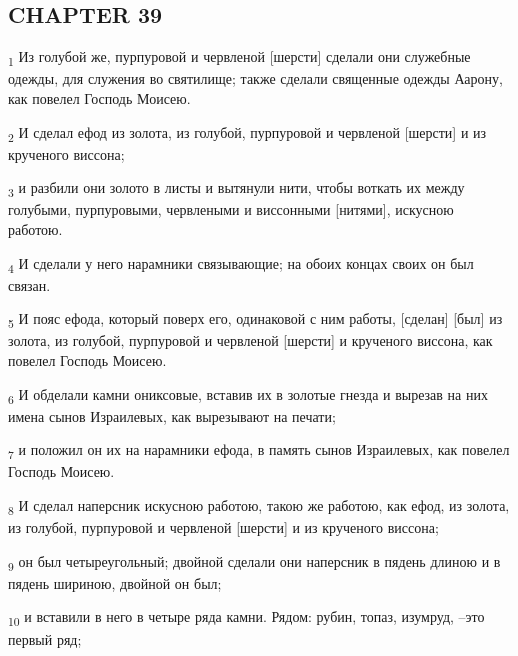\subsection{CHAPTER 39}
\begin{tcolorbox}
\textsubscript{1} Из голубой же, пурпуровой и червленой [шерсти] сделали они служебные одежды, для служения во святилище; также сделали священные одежды Аарону, как повелел Господь Моисею.
\end{tcolorbox}
\begin{tcolorbox}
\textsubscript{2} И сделал ефод из золота, из голубой, пурпуровой и червленой [шерсти] и из крученого виссона;
\end{tcolorbox}
\begin{tcolorbox}
\textsubscript{3} и разбили они золото в листы и вытянули нити, чтобы воткать их между голубыми, пурпуровыми, червлеными и виссонными [нитями], искусною работою.
\end{tcolorbox}
\begin{tcolorbox}
\textsubscript{4} И сделали у него нарамники связывающие; на обоих концах своих он был связан.
\end{tcolorbox}
\begin{tcolorbox}
\textsubscript{5} И пояс ефода, который поверх его, одинаковой с ним работы, [сделан] [был] из золота, из голубой, пурпуровой и червленой [шерсти] и крученого виссона, как повелел Господь Моисею.
\end{tcolorbox}
\begin{tcolorbox}
\textsubscript{6} И обделали камни ониксовые, вставив их в золотые гнезда и вырезав на них имена сынов Израилевых, как вырезывают на печати;
\end{tcolorbox}
\begin{tcolorbox}
\textsubscript{7} и положил он их на нарамники ефода, в память сынов Израилевых, как повелел Господь Моисею.
\end{tcolorbox}
\begin{tcolorbox}
\textsubscript{8} И сделал наперсник искусною работою, такою же работою, как ефод, из золота, из голубой, пурпуровой и червленой [шерсти] и из крученого виссона;
\end{tcolorbox}
\begin{tcolorbox}
\textsubscript{9} он был четыреугольный; двойной сделали они наперсник в пядень длиною и в пядень шириною, двойной он был;
\end{tcolorbox}
\begin{tcolorbox}
\textsubscript{10} и вставили в него в четыре ряда камни. Рядом: рубин, топаз, изумруд, --это первый ряд;
\end{tcolorbox}

